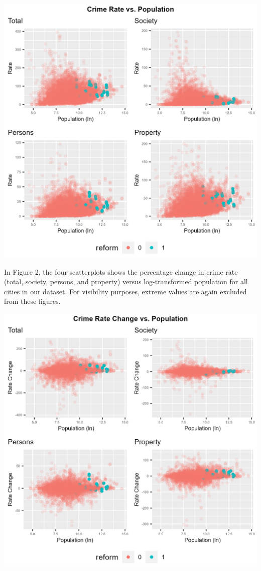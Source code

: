 \documentclass[
  12pt,
]{article}
\begin{document}
\includegraphics{Plots/Figure1.png}

In Figure 2, the four scatterplots shows the percentage change in crime
rate (total, society, persons, and property) versus log-transformed
population for all cities in our dataset. For visibility purposes,
extreme values are again excluded from these figures.

\includegraphics{Plots/Figure2.png}
\end{document}
